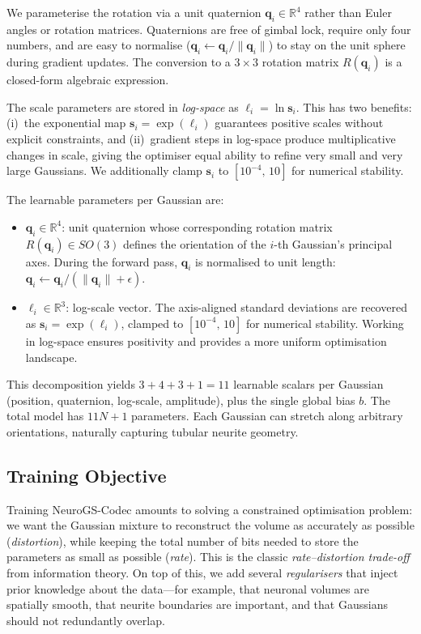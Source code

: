 \documentclass[11pt,a4paper]{article}
\begin{document}
We parameterise the rotation via a unit quaternion $\mathbf{q}_i \in \mathbb{R}^4$ rather than Euler angles or rotation matrices.  Quaternions are free of gimbal lock, require only four numbers, and are easy to normalise ($\mathbf{q}_i \leftarrow \mathbf{q}_i / \|\mathbf{q}_i\|$) to stay on the unit sphere during gradient updates.  The conversion to a $3\times3$ rotation matrix $R(\mathbf{q}_i)$ is a closed-form algebraic expression.

The scale parameters are stored in \emph{log-space} as $\boldsymbol{\ell}_i = \ln \mathbf{s}_i$.  This has two benefits: (i)~the exponential map $\mathbf{s}_i = \exp(\boldsymbol{\ell}_i)$ guarantees positive scales without explicit constraints, and (ii)~gradient steps in log-space produce multiplicative changes in scale, giving the optimiser equal ability to refine very small and very large Gaussians.  We additionally clamp $\mathbf{s}_i$ to $[10^{-4},\,10]$ for numerical stability.

The learnable parameters per Gaussian are:
\begin{itemize}
    \item $\mathbf{q}_i \in \mathbb{R}^4$: unit quaternion whose corresponding rotation matrix $R(\mathbf{q}_i)\in SO(3)$ defines the orientation of the $i$-th Gaussian's principal axes. During the forward pass, $\mathbf{q}_i$ is normalised to unit length: $\mathbf{q}_i \leftarrow \mathbf{q}_i / (\|\mathbf{q}_i\| + \epsilon)$.
    \item $\boldsymbol{\ell}_i \in \mathbb{R}^3$: log-scale vector.  The axis-aligned standard deviations are recovered as $\mathbf{s}_i = \exp(\boldsymbol{\ell}_i)$, clamped to $[10^{-4},\,10]$ for numerical stability.  Working in log-space ensures positivity and provides a more uniform optimisation landscape.
\end{itemize}
This decomposition yields $3 + 4 + 3 + 1 = 11$ learnable scalars per Gaussian (position, quaternion, log-scale, amplitude), plus the single global bias $b$.  The total model has $11N + 1$ parameters.  Each Gaussian can stretch along arbitrary orientations, naturally capturing tubular neurite geometry.

\subsection{Training Objective}
\label{subsec:objective}

Training NeuroGS-Codec amounts to solving a constrained optimisation problem: we want the Gaussian mixture to reconstruct the volume as accurately as possible (\emph{distortion}), while keeping the total number of bits needed to store the parameters as small as possible (\emph{rate}).  This is the classic \emph{rate--distortion trade-off} from information theory.  On top of this, we add several \emph{regularisers} that inject prior knowledge about the data---for example, that neuronal volumes are spatially smooth, that neurite boundaries are important, and that Gaussians should not redundantly overlap.
\end{document}
